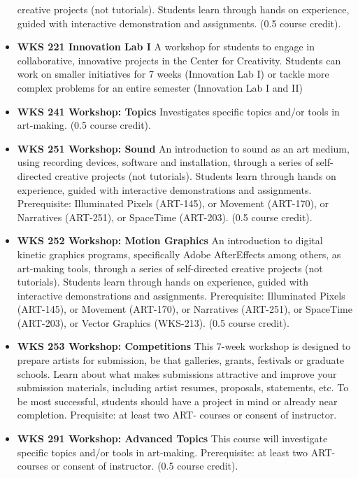 \documentclass[
  letterpaper,
]{scrbook}
\begin{document}
\begin{itemize}
  creative projects (not tutorials). Students learn through hands on
  experience, guided with interactive demonstration and assignments.
  (0.5 course credit).
\item
  \textbf{WKS 221 Innovation Lab I} A workshop for students to engage in
  collaborative, innovative projects in the Center for Creativity.
  Students can work on smaller initiatives for 7 weeks (Innovation Lab
  I) or tackle more complex problems for an entire semester (Innovation
  Lab I and II)\\
\item
  \textbf{WKS 241 Workshop: Topics} Investigates specific topics and/or
  tools in art-making. (0.5 course credit).
\item
  \textbf{WKS 251 Workshop: Sound} An introduction to sound as an art
  medium, using recording devices, software and installation, through a
  series of self-directed creative projects (not tutorials). Students
  learn through hands on experience, guided with interactive
  demonstrations and assignments. Prerequisite: Illuminated Pixels
  (ART-145), or Movement (ART-170), or Narratives (ART-251), or
  SpaceTime (ART-203). (0.5 course credit).\\
\item
  \textbf{WKS 252 Workshop: Motion Graphics} An introduction to digital
  kinetic graphics programs, specifically Adobe AfterEffects among
  others, as art-making tools, through a series of self-directed
  creative projects (not tutorials). Students learn through hands on
  experience, guided with interactive demonstrations and assignments.
  Prerequisite: Illuminated Pixels (ART-145), or Movement (ART-170), or
  Narratives (ART-251), or SpaceTime (ART-203), or Vector Graphics
  (WKS-213). (0.5 course credit).
\item
  \textbf{WKS 253 Workshop: Competitions} This 7-week workshop is
  designed to prepare artists for submission, be that galleries, grants,
  festivals or graduate schools. Learn about what makes submissions
  attractive and improve your submission materials, including artist
  resumes, proposals, statements, etc. To be most successful, students
  should have a project in mind or already near completion. Prequisite:
  at least two ART- courses or consent of instructor.
\item
  \textbf{WKS 291 Workshop: Advanced Topics} This course will
  investigate specific topics and/or tools in art-making. Prerequisite:
  at least two ART- courses or consent of instructor. (0.5 course
  credit).
\end{itemize}
\end{document}
